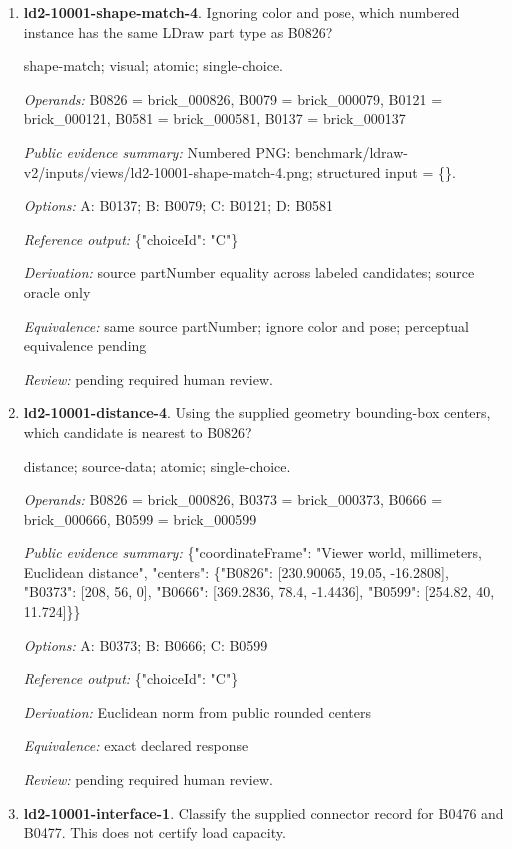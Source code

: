 \begin{enumerate}
\item \textbf{ld2-10001-shape-match-4}. Ignoring color and pose, which numbered instance has the same LDraw part type as B0826?
\par{\small shape-match; visual; atomic; single-choice.\par\textit{Operands:} B0826 = brick\_000826, B0079 = brick\_000079, B0121 = brick\_000121, B0581 = brick\_000581, B0137 = brick\_000137\par\textit{Public evidence summary:} Numbered PNG: benchmark/ldraw-v2/inputs/views/ld2-10001-shape-match-4.png; structured input = \{\}.\par\textit{Options:} A: B0137; B: B0079; C: B0121; D: B0581\par\textit{Reference output:} \{"choiceId": "C"\}\par\textit{Derivation:} source partNumber equality across labeled candidates; source oracle only\par\textit{Equivalence:} same source partNumber; ignore color and pose; perceptual equivalence pending\par\textit{Review:} pending required human review.}
\item \textbf{ld2-10001-distance-4}. Using the supplied geometry bounding-box centers, which candidate is nearest to B0826?
\par{\small distance; source-data; atomic; single-choice.\par\textit{Operands:} B0826 = brick\_000826, B0373 = brick\_000373, B0666 = brick\_000666, B0599 = brick\_000599\par\textit{Public evidence summary:} \{"coordinateFrame": "Viewer world, millimeters, Euclidean distance", "centers": \{"B0826": [230.90065, 19.05, -16.2808], "B0373": [208, 56, 0], "B0666": [369.2836, 78.4, -1.4436], "B0599": [254.82, 40, 11.724]\}\}\par\textit{Options:} A: B0373; B: B0666; C: B0599\par\textit{Reference output:} \{"choiceId": "C"\}\par\textit{Derivation:} Euclidean norm from public rounded centers\par\textit{Equivalence:} exact declared response\par\textit{Review:} pending required human review.}
\item \textbf{ld2-10001-interface-1}. Classify the supplied connector record for B0476 and B0477. This does not certify load capacity.

\end{enumerate}
